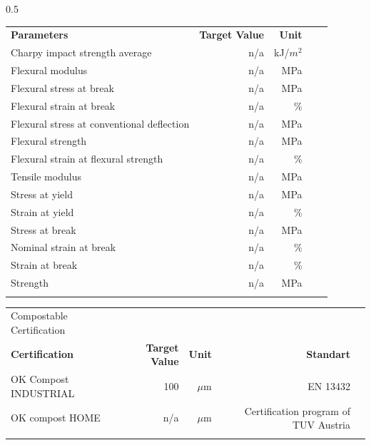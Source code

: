 \documentclass{article}
\begin{document}
\begin{center}
\begin{paracol}{2}
\begin{tabularx}{0.5\textwidth}
\end{tabularx}\switchcolumn\begin{tabularx}{0.5\textwidth}
{X r  r  r  r }\textbf{Parameters} & \textbf{Target Value} & \textbf{Unit} &  &  \\
Charpy impact strength average & n/a & kJ/\(m^2\) &  &  \\
\arrayrulecolor{line_color}\hline
Flexural modulus & n/a & MPa &  &  \\
\arrayrulecolor{line_color}\hline
Flexural stress at break & n/a & MPa &  &  \\
\arrayrulecolor{line_color}\hline
Flexural strain at break & n/a & \% &  &  \\
\arrayrulecolor{line_color}\hline
Flexural stress at conventional deflection & n/a & MPa &  &  \\
\arrayrulecolor{line_color}\hline
Flexural strength & n/a & MPa &  &  \\
\arrayrulecolor{line_color}\hline
Flexural strain at flexural strength & n/a & \% &  &  \\
\arrayrulecolor{line_color}\hline
Tensile modulus & n/a & MPa &  &  \\
\arrayrulecolor{line_color}\hline
Stress at yield & n/a & MPa &  &  \\
\arrayrulecolor{line_color}\hline
Strain at yield & n/a & \% &  &  \\
\arrayrulecolor{line_color}\hline
Stress at break & n/a & MPa &  &  \\
\arrayrulecolor{line_color}\hline
Nominal strain at break & n/a & \% &  &  \\
\arrayrulecolor{line_color}\hline
Strain at break & n/a & \% &  &  \\
\arrayrulecolor{line_color}\hline
Strength & n/a & MPa &  &  \\
\arrayrulecolor{line_color}\hline

\end{tabularx}
\end{paracol}
\end{center}
\begin{center}
\begin{tabularx}
{\textwidth}{X r  r  r  r }\rowcolor{color_title}Compostable Certification &  &  &  &  \\
\textbf{Certification} & \textbf{Target Value} & \textbf{Unit} & \textbf{Standart} &  \\
OK Compost INDUSTRIAL & 100 & \(\mu\)m & EN 13432 &  \\
\arrayrulecolor{line_color}\hline
OK compost HOME & n/a & \(\mu\)m & Certification program of TUV Austria &  \\
\arrayrulecolor{line_color}\hline

\end{tabularx}
\end{center}
\end{document}
